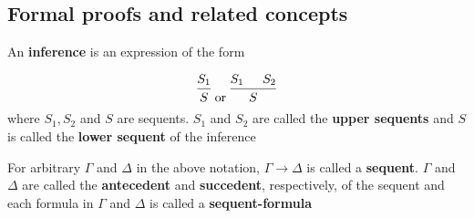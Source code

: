 \documentclass[11pt]{article}
\begin{document}
\subsection{Formal proofs and related concepts}
\label{sec:org1e6563d}
\begin{definition}[]
An \textbf{inference} is an expression of the form

\begin{equation*}
\begin{prooftree}[center=false]
\hypo{S_1}
\infer1{S}
\end{prooftree}\text{ or }
\begin{prooftree}[center=false]
\hypo{S_1}
\hypo{S_2}
\infer2{S}
\end{prooftree}
\end{equation*}
where \(S_1,S_2\) and \(S\) are sequents. \(S_1\) and \(S_2\) are called the
\textbf{upper sequents} and \(S\) is called the \textbf{lower sequent} of the inference
\end{definition}

\begin{definition}[]
For arbitrary \(\Gamma\) and \(\Delta\) in the above notation, \(\Gamma\to\Delta\) is called a
\textbf{sequent}. \(\Gamma\) and \(\Delta\) are called the \textbf{antecedent} and \textbf{succedent},
respectively, of the sequent and each formula in \(\Gamma\) and \(\Delta\) is called a
\textbf{sequent-formula} 
\end{definition}
\end{document}
